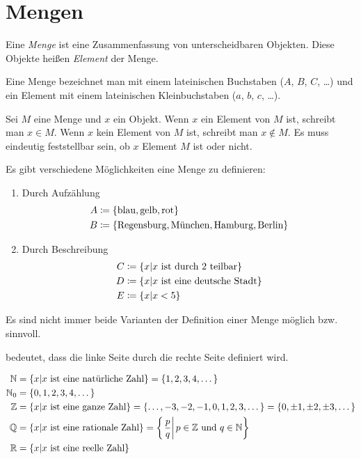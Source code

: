 \section{Mengen}
\begin{definition}[Menge]
Eine \emph{Menge} ist eine Zusammenfassung von unterscheidbaren Objekten. Diese Objekte heißen \emph{Element} der Menge.
\end{definition}

Eine Menge bezeichnet man mit einem lateinischen Buchstaben ($A$, $B$, $C$, \dots) und ein Element mit einem lateinischen Kleinbuchstaben ($a$, $b$, $c$, \dots).

Sei $M$ eine Menge und $x$ ein Objekt. Wenn $x$ ein Element von $M$ ist, schreibt man $x \in M$. Wenn $x$ kein Element von $M$ ist, schreibt man $x \notin M$. Es muss eindeutig feststellbar sein, ob $x$ Element $M$ ist oder nicht.

Es gibt verschiedene Möglichkeiten eine Menge zu definieren:
\begin{enumerate}
\item Durch Aufzählung
	\begin{align*}
	A &\mathrel{\mathop:\!\!=} \left\{\text{blau}, \text{gelb}, \text{rot}\right\}\\
	B &\mathrel{\mathop:\!\!=} \left\{\text{Regensburg}, \text{München}, \text{Hamburg}, \text{Berlin}\right\}
	\end{align*}
\item Durch Beschreibung
	\begin{align*}
	C &\mathrel{\mathop:\!\!=} \left\{x \vert x \text{ ist durch $2$ teilbar}\right\}\\
	D &\mathrel{\mathop:\!\!=} \left\{x \vert x \text{ ist eine deutsche Stadt}\right\}\\
	E &\mathrel{\mathop:\!\!=} \left\{x \vert x < 5\right\}
	\end{align*}
\end{enumerate}
\begin{note}
Es sind nicht immer beide Varianten der Definition einer Menge möglich \ac{bzw.} sinnvoll.
\end{note}

\begin{note}
\enq{\ceq} bedeutet, dass die linke Seite durch die rechte Seite definiert wird.
\end{note}

\begin{example}
\begin{align*}
\mathbb{N} &= \left\{x \vert x \text{ ist eine natürliche Zahl}\right\} = \left\{1, 2, 3, 4, \dots\right\}\\
\mathbb{N}_0 &= \left\{0, 1, 2, 3, 4, \dots\right\}\\
\mathbb{Z} &= \left\{x \vert x \text{ ist eine ganze Zahl}\right\} = \left\{\dots, -3, -2, -1, 0, 1, 2, 3, \dots\right\} = \left\{0, \pm 1, \pm 2, \pm 3, \dots\right\}\\
\mathbb{Q} &= \left\{x \vert x \text{ ist eine rationale Zahl}\right\} = \left\{\left.\frac{p}{q} \right| p \in \mathbb{Z} \text{ und } q \in \mathbb{N}\right\}\\
\mathbb{R} &= \left\{x \vert x \text{ ist eine reelle Zahl}\right\}
\end{align*}
\end{example}

